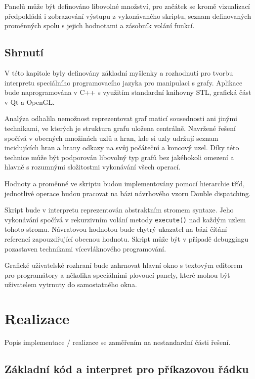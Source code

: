 \documentclass[11pt,twoside,a4paper]{book}
\begin{document}
Panelů může být definováno libovolné množství, pro začátek se kromě vizualizací před\-po\-klá\-dá i zobrazování výstupu z vykonávaného skriptu, seznam definovaných proměnných spolu s jejich hodnotami a zásobník volání funkcí.


\section{Shrnutí}

V této kapitole byly definovány základní myšlenky a rozhodnutí pro tvorbu interpretu speciálního programovacího jazyka pro manipulaci s grafy. Aplikace bude naprogramována v C++ s využitím standardní knihovny STL, grafická část v Qt a OpenGL.

Analýza odhalila nemožnost reprezentovat graf maticí sousednosti ani jinými technikami, ve kterých je struktura grafu uložena centrálně. Navržené řešení spočívá v obecných množinách uzlů a hran, kde si uzly udržují seznam incidujících hran a hrany odkazy na svůj počáteční a koncový uzel. Díky této technice může být podporován libovolný typ grafů bez jakéhokoli omezení a hlavně s rozumnými složitostmi vykonávání všech operací.

Hodnoty a proměnné ve skriptu budou implementovány pomocí hierarchie tříd, jednotlivé operace budou pracovat na bázi návrhového vzoru Double dispatching.

Skript bude v interpretu reprezentován abstraktním stromem syntaxe. Jeho vykonávání spočívá v rekurzivním volání metody \texttt{execute()} nad každým uzlem tohoto stromu. Návratovou hodnotou bude chytrý ukazatel na bázi čítání referencí zapouzdřující obecnou hodnotu. Skript může být v případě debuggingu pozastaven technikami ví\-ce\-vlák\-no\-vé\-ho programování.

Grafické uživatelské rozhraní bude zahrnovat hlavní okno s textovým editorem pro programátory a několika speciálními plovoucí panely, které mohou být uživatelem vytrnuty do samostatného okna.



\chapter{Realizace}

Popis implementace / realizace se zaměřením na nestandardní části řešení.

\section{Základní kód a interpret pro příkazovou řádku}
\end{document}
